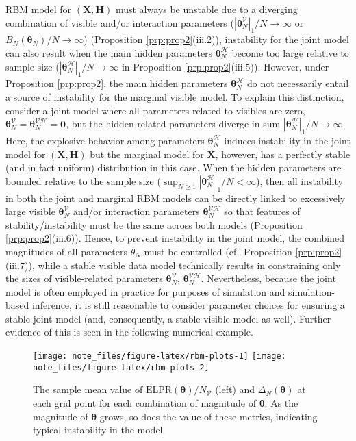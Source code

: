 \documentclass[]{article}
\theoremstyle{definition}
\newcommand{\DN}{\Delta_N}
\newcommand{\Gam}{B_{N}(\boldsymbol \theta_N) }
\begin{document}
RBM model for \((\boldsymbol X,\boldsymbol H)\) must always be unstable
due to a diverging combination of visible and/or interaction parameters
(\(|\boldsymbol \theta_N^{\mathcal{V}}|_1/N\to \infty\) or
\(\Gam/N\to \infty\)) (Proposition \ref{prp:prop2}(iii.2)), instability
for the joint model can also result when the main hidden parameters
\(\boldsymbol \theta_N^{\mathcal{H}}\) become too large relative to
sample size (\(|\boldsymbol \theta_N^{\mathcal{H}}|_1/N\to \infty\) in
Proposition \ref{prp:prop2}(iii.5)). However, under Proposition
\ref{prp:prop2}, the main hidden parameters
\(\boldsymbol \theta_N^{\mathcal{H}}\) do not necessarily entail a
source of instability for the marginal visible model. To explain this
distinction, consider a joint model where all parameters related to
visibles are zero,
\(\boldsymbol \theta_N^{\mathcal{V}}= \boldsymbol \theta_N^{\mathcal{VH}}=\boldsymbol 0\),
but the hidden-related parameters diverge in sum
\(|\boldsymbol \theta_N^{\mathcal{H}}|_1/N\to \infty\). Here, the
explosive behavior among parameters
\(\boldsymbol \theta_N^{\mathcal{H}}\) induces instability in the joint
model for \((\boldsymbol X, \boldsymbol H)\) but the marginal model for
\(\boldsymbol X\), however, has a perfectly stable (and in fact uniform)
distribution in this case. When the hidden parameters are bounded
relative to the sample size
(\(\sup_{N\geq 1} |\boldsymbol \theta_N^{\mathcal{H}}|_1/N<\infty\)),
then all instability in both the joint and marginal RBM models can be
directly linked to excessively large visible
\(\boldsymbol \theta_N^{\mathcal{V}}\) and/or interaction parameters
\(\boldsymbol \theta_N^{\mathcal{VH}}\) so that features of
stability/instability must be the same across both models (Proposition
\ref{prp:prop2}(iii.6)). Hence, to prevent instability in the joint
model, the combined magnitudes of all parameters \(\theta_N\) must be
controlled (cf.~Proposition \ref{prp:prop2}(iii.7)), while a stable
visible data model technically results in constraining only the sizes of
visible-related parameters \(\boldsymbol \theta_N^{\mathcal{V}}\),
\(\boldsymbol \theta_N^{\mathcal{VH}}\). Nevertheless, because the joint
model is often employed in practice for purposes of simulation and
simulation-based inference, it is still reasonable to consider parameter
choices for ensuring a stable joint model (and, consequently, a stable
visible model as well). Further evidence of this is seen in the
following numerical example. \par
\begin{figure}
\texttt{[image: note\_files/figure-latex/rbm-plots-1]} \texttt{[image: note\_files/figure-latex/rbm-plots-2]} \caption{The sample mean value of $\text{ELPR}(\boldsymbol \theta)/N_{\mathcal{V}}$ (left) and $\DN(\boldsymbol \theta)$ at each grid point for each combination of magnitude of $\boldsymbol \theta$. As the magnitude of $\boldsymbol \theta$ grows, so does the value of these metrics, indicating typical instability in the model.}\label{fig:rbm-plots}
\end{figure}
\end{document}

